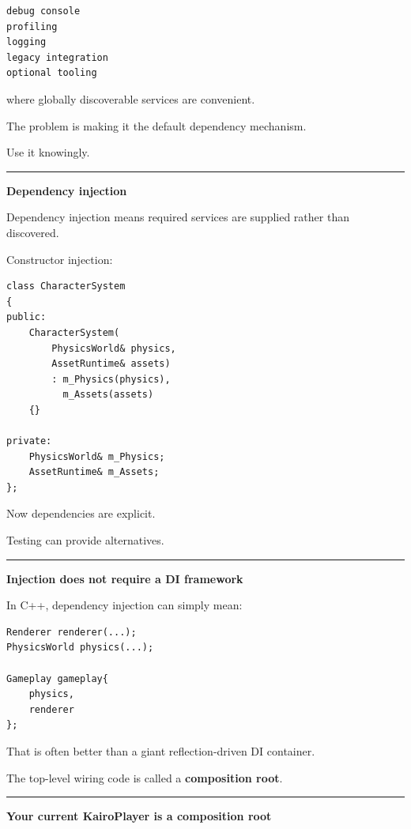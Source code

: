 \begin{verbatim}
debug console
profiling
logging
legacy integration
optional tooling
\end{verbatim}

where globally discoverable services are convenient.

The problem is making it the default dependency mechanism.

Use it knowingly.

\begin{center}\rule{0.5\linewidth}{0.5pt}\end{center}

\textbf{Dependency injection}

Dependency injection means required services are supplied rather than discovered.

Constructor injection:

\begin{verbatim}
class CharacterSystem
{
public:
    CharacterSystem(
        PhysicsWorld& physics,
        AssetRuntime& assets)
        : m_Physics(physics),
          m_Assets(assets)
    {}

private:
    PhysicsWorld& m_Physics;
    AssetRuntime& m_Assets;
};
\end{verbatim}

Now dependencies are explicit.

Testing can provide alternatives.

\begin{center}\rule{0.5\linewidth}{0.5pt}\end{center}

\textbf{Injection does not require a DI framework}

In C++, dependency injection can simply mean:

\begin{verbatim}
Renderer renderer(...);
PhysicsWorld physics(...);

Gameplay gameplay{
    physics,
    renderer
};
\end{verbatim}

That is often better than a giant reflection-driven DI container.

The top-level wiring code is called a \textbf{composition root}.

\begin{center}\rule{0.5\linewidth}{0.5pt}\end{center}

\textbf{Your current KairoPlayer  is a composition root}

